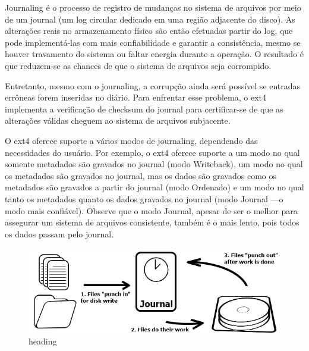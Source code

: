 \documentclass[
	12pt,				%
	openright,			%
	oneside,			%
	a4paper,			%
	chapter=TITLE,		%
	english,			%
	french,				%
	spanish,			%
	brazil				%
	]{abntex2}
\theoremstyle{definition}
\begin{document}
Journaling é o processo de registro de mudanças no sistema de arquivos por meio de um journal (um log circular dedicado em uma região adjacente do disco). As alterações reais no armazenamento físico são então efetuadas partir do log, que pode implementá-las com mais confiabilidade e garantir a consistência, mesmo se houver travamento do sistema ou faltar energia durante a operação. O resultado é que reduzem-se as chances de que o sistema de arquivos seja corrompido.

Entretanto, mesmo com o journaling, a corrupção ainda será possível se entradas errôneas forem inseridas no diário. Para enfrentar esse problema, o ext4 implementa a verificação de checksum do journal para certificar-se de que as alterações válidas cheguem ao sistema de arquivos subjacente.

O ext4 oferece suporte a vários modos de journaling, dependendo das necessidades do usuário. Por exemplo, o ext4 oferece suporte a um modo no qual somente metadados são gravados no journal (modo Writeback), um modo no qual os metadados são gravados no journal, mas os dados são gravados como os metadados são gravados a partir do journal (modo Ordenado) e um modo no qual tanto os metadados quanto os dados gravados no journal (modo Journal —o modo mais confiável). Observe que o modo Journal, apesar de ser o melhor para assegurar um sistema de arquivos consistente, também é o mais lento, pois todos os dados passam pelo journal.

\begin{figure}[H]
	\centering
	\includegraphics[width=1.0\textwidth]{journaling.png}
	\caption{heading}
	\label{fig:journaling}
\end{figure}

\end{document}
